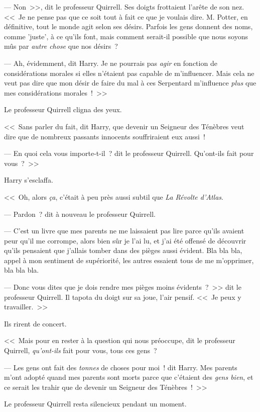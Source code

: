 --- Non~>>, dit le professeur Quirrell. Ses doigts frottaient l'arête de son nez. <<~Je ne pense pas que ce soit tout à fait ce que je voulais dire. M. Potter, en définitive, tout le monde agit selon ses désirs. Parfois les gens donnent des noms, comme 'juste', à ce qu'ils font, mais comment serait-il possible que nous soyons mûs par \emph{autre chose} que nos désirs~?

--- Ah, évidemment, dit Harry. Je ne pourrais pas \emph{agir} en fonction de considérations morales si elles n'étaient pas capable de m'influencer. Mais cela ne veut pas dire que mon désir de faire du mal à ces Serpentard m'influence \emph{plus} que mes considérations morales~!~>>

Le professeur Quirrell cligna des yeux.

<<~Sans parler du fait, dit Harry, que devenir un Seigneur des Ténèbres veut dire que de nombreux passants innocents souffriraient eux aussi~!

--- En quoi cela vous importe-t-il~? dit le professeur Quirrell. Qu'ont-ils fait pour vous~?~>>

Harry s'esclaffa.

<<~Oh, alors \emph{ça}, c'était à peu près aussi subtil que \emph{La Révolte d'Atlas}.

--- Pardon~? dit à nouveau le professeur Quirrell.

--- C'est un livre que mes parents ne me laissaient pas lire parce qu'ils avaient peur qu'il me corrompe, alors bien sûr je l'ai lu, et j'ai été offensé de découvrir qu'ils pensaient que j'allais tomber dans des pièges aussi évident. Bla bla bla, appel à mon sentiment de supériorité, les autres essaient tous de me m'opprimer, bla bla bla.

--- Donc vous dites que je dois rendre mes pièges moins évidents~?~>> dit le professeur Quirrell. Il tapota du doigt sur sa joue, l'air pensif. <<~Je peux y travailler.~>>

Ils rirent de concert.

<<~Mais pour en rester à la question qui nous préoccupe, dit le professeur Quirrell, \emph{qu'ont-ils} fait pour vous, tous ces gens~?

--- Les gens ont fait des \emph{tonnes} de choses pour moi~! dit Harry. Mes parents m'ont adopté quand mes parents sont morts parce que c'étaient des \emph{gens bien}, et ce serait les trahir que de devenir un Seigneur des Ténèbres~!~>>

Le professeur Quirrell resta silencieux pendant un moment.

